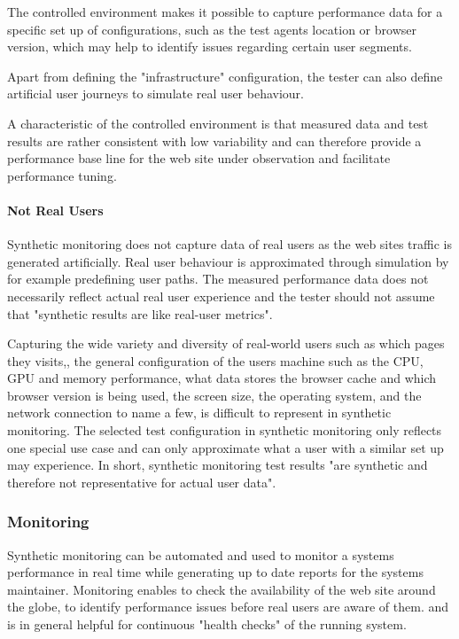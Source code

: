 The controlled environment makes it possible to capture performance data for a specific set up of configurations, such as the test agents location or browser version, which may help to identify issues regarding certain user segments. %

Apart from defining the "infrastructure" configuration, the tester can also define artificial user journeys to simulate real user behaviour. %

A characteristic of the controlled environment is that measured data and test results are rather consistent with low variability and can therefore provide a performance base line for the web site under observation and facilitate performance tuning.%


\paragraph{Not Real Users}

Synthetic monitoring does not capture data of real users as the web sites traffic is generated artificially.
Real user behaviour is approximated through simulation by for example predefining user paths.
The measured performance data does not necessarily reflect actual real user experience and the tester should not assume that "synthetic results are like real-user metrics". %

Capturing the wide variety and diversity of real-world users such as which pages they visits,, the general configuration of the users machine such as the CPU, GPU and memory performance, what data stores the browser cache and which browser version is being used, the screen size, the operating system, and the network connection to name a few, is difficult to represent in synthetic monitoring. %
The selected test configuration in synthetic monitoring only reflects one special use case and can only approximate what a user with a similar set up may experience. %
In short, synthetic monitoring test results "are synthetic and therefore not representative for actual user data".  %



\subsubsection{Monitoring}


Synthetic monitoring can be automated and used to monitor a systems performance in real time while generating up to date reports for the systems maintainer. %
Monitoring enables to check the availability of the web site around the globe, %
to identify performance issues before real users are aware of them. %
and is in general helpful for continuous "health checks" of the running system. %

